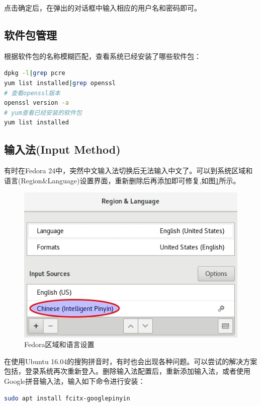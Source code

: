 \documentclass[letter]{book}
\begin{document}
点击确定后，在弹出的对话框中输入相应的用户名和密码即可。

\subsection{软件包管理}

根据软件包的名称模糊匹配，查看系统已经安装了哪些软件包：

\begin{lstlisting}[language=Bash]
dpkg -l|grep pcre
yum list installed|grep openssl
# 查看openssl版本
openssl version -a
# yum查看已经安装的软件包
yum list installed
\end{lstlisting}

\subsection{输入法(Input Method)}

有时在Fedora 24中，突然中文输入法切换后无法输入中文了。可以到系统区域和语言(Region\&Language)设置界面，重新删除后再添加即可修复,如图\ref{fig:regionandlanguagesetting}所示。

\begin{figure}[htbp]
	\centering
	\includegraphics[scale=0.6]{regionandlanguagesetting.jpg}
	\caption{Fedora区域和语言设置}
	\label{fig:regionandlanguagesetting}
\end{figure}

在使用Ubuntu 16.04的搜狗拼音时，有时也会出现各种问题。可以尝试的解决方案包括，登录系统再次重新登入。删除输入法配置后，重新添加输入法，或者使用Google拼音输入法，输入如下命令进行安装：

\begin{lstlisting}[language=Bash]
sudo apt install fcitx-googlepinyin
\end{lstlisting}
\end{document}
